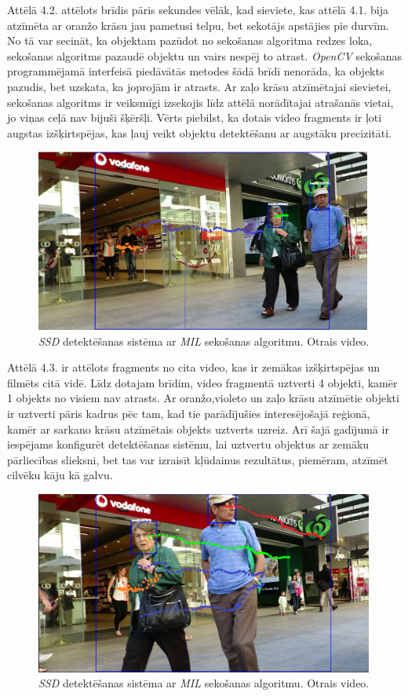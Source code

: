 Attēlā 4.2. attēlots brīdis pāris sekundes vēlāk, kad sieviete, kas attēlā 4.1. bija atzīmēta ar oranžo krāsu jau pametusi telpu, bet sekotājs apstājies pie durvīm. No tā var secināt, ka objektam pazūdot no sekošanas algoritma redzes loka, sekošanas algoritms pazaudē objektu un vairs nespēj to atrast. \textit{OpenCV} sekošanas programmējamā interfeisā piedāvātās metodes šādā brīdī nenorāda, ka objekts pazudis, bet uzskata, ka joprojām ir atrasts. Ar zaļo krāsu atzīmētajai sievietei, sekošanas algoritms ir veiksmīgi izsekojis līdz attēlā norādītajai atrašanās vietai, jo viņas ceļā nav bijuši šķēršļi. Vērts piebilst, ka dotais video fragments ir ļoti augstas izšķirtspējas, kas ļauj veikt objektu detektēšanu ar augstāku precizitāti. 

\begin{figure}[h]%
	\centering
	\includegraphics[height=6cm]{images/ssd3.png} %
	\caption{\textit{SSD} detektēšanas sistēma ar \textit{MIL} sekošanas algoritmu. Otrais video.}%
	\label{fig:example}%
\end{figure}

Attēlā 4.3. ir attēlots fragments no cita video, kas ir zemākas izšķirtspējas un filmēts citā vidē. Līdz dotajam brīdim, video fragmentā uztverti 4 objekti, kamēr 1 objekts no visiem nav atrasts. Ar oranžo,violeto un zaļo krāsu atzīmētie objekti ir uztverti pāris kadrus pēc tam, kad tie parādījušies interesējošajā reģionā, kamēr ar sarkano krāsu atzīmētais objekts uztverts uzreiz. Arī šajā gadījumā ir iespējams konfigurēt detektēšanas sistēmu, lai uztvertu objektus ar zemāku pārliecības slieksni, bet tas var izraisīt kļūdainus rezultātus, piemēram, atzīmēt cilvēku kāju kā galvu.

\begin{figure}[h]%
	\centering
	\includegraphics[height=6cm]{images/ssd4.png} %
	\caption{\textit{SSD} detektēšanas sistēma ar \textit{MIL} sekošanas algoritmu. Otrais video.}%
	\label{fig:example}%
\end{figure}

